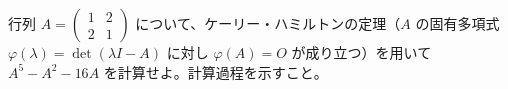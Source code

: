 
行列 $A = \begin{pmatrix} 1 & 2 \\ 2 & 1 \end{pmatrix}$ について、ケーリー・ハミルトンの定理（$A$ の固有多項式 $\varphi(\lambda) = \det(\lambda I - A)$ に対し $\varphi(A) = O$ が成り立つ）を用いて $A^{5} - A^{2} - 16A$ を計算せよ。計算過程を示すこと。
